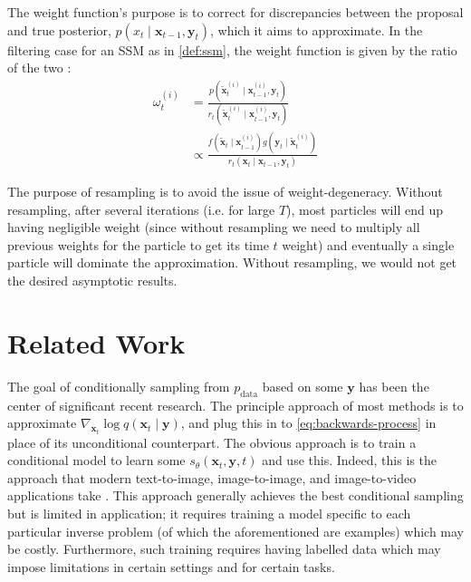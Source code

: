 \begin{remark}
    The weight function's purpose is to correct for discrepancies between the proposal and true
    posterior, $p(x_t \mid \mathbf{x}_{t-1}, \mathbf{y}_t)$, which it aims to approximate. In the
    filtering case for an SSM as in \ref{def:ssm}, the weight function is given by the ratio of the
    two \parencite{chopinIntroductionSequentialMonte2020}:
    \begin{align}
        \omega_t^{(i)} &= \frac{p(\tilde{\mathbf{x}}_t^{(i)} \mid \mathbf{x}_{t-1}^{(i)}, \mathbf{y}_t)}{r_t(\tilde{\mathbf{x}}_t^{(i)} \mid \mathbf{x}_{t-1}^{(i)}, \mathbf{y}_{t})} \nonumber \\
        &\propto \frac{f(\tilde{\mathbf{x}}_t \mid \mathbf{x}_{t-1}^{(i)})g(\mathbf{y}_t \mid \tilde{\mathbf{x}}_t^{(i)})}{r_t(\mathbf{x}_t \mid \mathbf{x}_{t-1}, \mathbf{y}_{t})} \label{eq:weight-func-gen}
    \end{align}
\end{remark}

\begin{remark}[Resampling]
    The purpose of resampling is to avoid the issue of weight-degeneracy. Without resampling,
    after several iterations (i.e. for large $T$), most particles will end up having negligible
    weight (since without resampling we need to multiply all previous weights for the particle to
    get its time $t$ weight) and eventually a single particle will dominate the approximation.
    Without resampling, we would not get the desired asymptotic results.
\end{remark}

\section{Related Work} \label{sec:related-work}

The goal of conditionally sampling from $p_{\text{data}}$ based on some $\mathbf{y}$ has been the
center of significant recent research. The principle approach of most methods is to
approximate $\nabla_{\mathbf{x}_t}\log q(\mathbf{x}_t \mid \mathbf{y})$, and plug this in to
\ref{eq:backwards-process} in place of its unconditional counterpart. The obvious approach is to
train a conditional model to learn some $s_{\theta}(\mathbf{x}_t, \mathbf{y}, t)$ and use this.
Indeed, this is the approach that modern text-to-image, image-to-image, and image-to-video
applications take \parencite{nicholGLIDEPhotorealisticImage2021,liDiffusionModelsImage2023,
sahariaPaletteImagetoImageDiffusion2021,sahariaPaletteImagetoImageDiffusion2021,
rombachHighResolutionImageSynthesis2021}. This approach generally achieves the best conditional
sampling but is limited in application; it requires training a model specific to each particular
inverse problem (of which the aforementioned are examples) which may be costly. Furthermore, such
training requires having labelled data which may impose limitations in certain settings and for
certain tasks.

